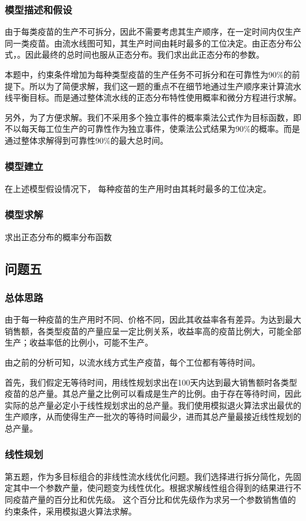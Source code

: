 \documentclass[UTF8]{ctexart}
\begin{document}
	\subsubsection{模型描述和假设}
	由于每类疫苗的生产不可拆分，因此不需要考虑其生产顺序，在一定时间内仅生产同一类疫苗。由流水线图可知，其生产时间由耗时最多的工位决定。由正态分布公式，。因此最终的总时间也服从正态分布。我们求出此正态分布的参数。
	
	本题中，约束条件增加为每种类型疫苗的生产任务不可拆分和在可靠性为90\%的前提下。所以为了简便求解，我们这一题的重点不在细节地通过生产顺序来计算流水线平衡目标。而是通过整体流水线的正态分布特性使用概率和微分方程进行求解。
	
	另外，为了方便求解。我们不采用多个独立事件的概率乘法公式作为目标函数，即不以每天每工位生产的可靠性作为独立事件，使乘法公式结果为90\%的概率。而是通过整体求解得到可靠性90\%的最大总时间。
	\subsubsection{模型建立}
	在上述模型假设情况下，
	每种疫苗的生产用时由其耗时最多的工位决定。
	\subsubsection{模型求解}
	求出正态分布的概率分布函数
	\subsection{问题五}
	\subsubsection{总体思路}
	由于每一种疫苗的生产用时不同、价格不同，因此其收益率各有差异。为达到最大销售额，各类型疫苗的产量应呈一定比例关系，收益率高的疫苗比例大，可能全部生产；收益率低的比例小，可能不生产。
	\par 由之前的分析可知，以流水线方式生产疫苗，每个工位都有等待时间。
	\par 首先，我们假定无等待时间，用线性规划求出在100天内达到最大销售额时各类型疫苗的总产量。其总产量之比例可以看成是生产的比例。由于存在等待时间，因此实际的总产量必定小于线性规划求出的总产量。我们使用模拟退火算法求出最优的生产顺序，从而使得生产一批次的等待时间最少，进而其总产量最接近线性规划的总产量。
	\subsubsection{线性规划}
	
	第五题，作为多目标组合的非线性流水线优化问题。我们选择进行拆分简化，先固定其中一个参数产量，使问题变为线性优化。根据求解线性组合得到的结果进行不同疫苗产量的百分比和优先级。
	这个百分比和优先级作为求另一个参数销售值的约束条件，采用模拟退火算法求解。
	
\end{document}
